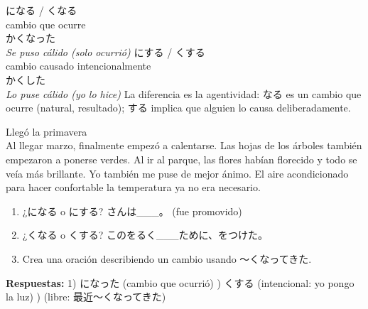   {になる / くなる\\\small cambio que ocurre\\\small {}かくなった\\\textit{Se puso cálido (solo ocurrió)}}
  {にする / くする\\\small cambio causado intencionalmente\\\small {}かくした\\\textit{Lo puse cálido (yo lo hice)}}
  {La diferencia es la agentividad: なる es un cambio que ocurre (natural, resultado); する implica que alguien lo causa deliberadamente.}



{Llegó la primavera\\[0.4em]
  Al llegar marzo, finalmente empezó a calentarse. Las hojas de los árboles también empezaron a ponerse verdes. Al ir al parque, las flores habían florecido y todo se veía más brillante. Yo también me puse de mejor ánimo. El aire acondicionado para hacer confortable la temperatura ya no era necesario.}

\begin{tcolorbox}[ejerciciobox, title={\emoji{pencil} Ejercicios}]
\begin{enumerate}
  \item ¿になる o にする? さんは\_\_\_。 (fue promovido)
  \item ¿くなる o くする? このをるく\_\_\_ために、をつけた。
  \item Crea una oración describiendo un cambio usando 〜くなってきた.
\end{enumerate}
\textbf{Respuestas:}
1) になった (cambio que ocurrió) ) くする (intencional: yo pongo la luz) ) (libre: 最近〜くなってきた)
\end{tcolorbox}

